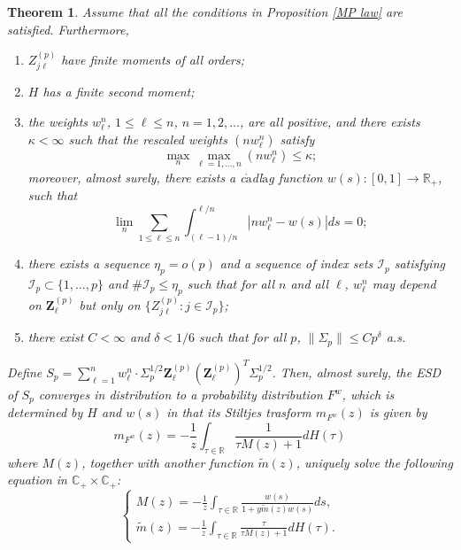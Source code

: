 \documentclass[a4paper,11pt]{book}
\theoremstyle{plain}
\newtheorem{thm}{Theorem}[chapter]%
\theoremstyle{definition}
\newcommand{\MR}{\mathbb{R}}
\begin{document}
    \begin{thm} \label{Thm 1}
    	Assume that all the conditions in Proposition \ref{MP law} are satisfied. Furthermore,
    	\begin{enumerate}
    		\item $Z_{j\ell}^{(p)}$ have finite moments of all orders;
    		\item $H$ has a finite second moment;
    		\item the weights $w_\ell^n$, $1 \leq \ell \leq n$, $n = 1, 2, \dots$, are all positive, and there exists $\kappa < \infty$ such that the rescaled weights $(nw_\ell^n)$ satisfy
    		\[ \max_n \max_{\ell = 1, \dots, n} (nw_\ell^n) \leq \kappa; \]
    		moreover, almost surely, there exists a c$\grave{\text{a}}$dl$\grave{\text{a}}$g function $w(s): [0, 1] \rightarrow \MR_{+}$, such that
    		\[ \lim_n \sum_{1 \leq \ell \leq n} \int_{(\ell-1)/n}^{\ell/n} |n w_\ell^n - w(s)|ds = 0; \]
    		\item there exists a sequence $\eta_p = o(p)$ and a sequence of index sets $\mathcal{I}_p$ satisfying $\mathcal{I}_p \subset \{1, \dots, p\}$ and $\#\mathcal{I}_p \leq \eta_p$ such that for all $n$ and all $\ell$, $w_\ell^n$ may depend on $\mathbf{Z}_\ell^{(p)}$ but only on $\{ Z_{j\ell}^{(p)}: j \in \mathcal{I}_p \}$;
    		\item there exist $C < \infty$ and $\delta < 1/6$ such that for all $p$, $\| \Sigma_p \| \leq Cp^\delta$ a.s.
    	\end{enumerate}
    	Define $S_p = \sum_{\ell=1}^{n} w_\ell^n \cdot \Sigma_p^{1/2} \mathbf{Z}_\ell^{(p)} (\mathbf{Z}_\ell^{(p)})^T\Sigma_p^{1/2} $. Then, almost surely, the ESD of $S_p$ converges in distribution to a probability distribution $F^w$, which is determined by $H$ and $w(s)$ in that its Stiltjes trasform $m_{F^w}(z)$ is given by
    	\begin{equation} \label{Thm 1 eq}
    	    m_{F^w}(z) = -\frac{1}{z} \int_{\tau \in \MR} \frac{1}{\tau M(z) + 1} dH(\tau)
    	\end{equation}
    	where $M(z)$, together with another function $\tilde{m}(z)$, uniquely solve the following equation in $\mathbb{C}_{+} \times \mathbb{C}_{+}$:
    	\[
    	\left \{
    	\begin{array}{l}
    		M(z) = -\frac{1}{z} \int_{\tau \in \MR} \frac{w(s)}{1 + y \tilde{m}(z)w(s)} ds,  \\
    		\tilde{m}(z) =  -\frac{1}{z} \int_{\tau \in \MR} \frac{\tau}{\tau M(z) + 1} dH(\tau).
    	\end{array}
    	\right.
    	\]
    \end{thm}
\end{document}
